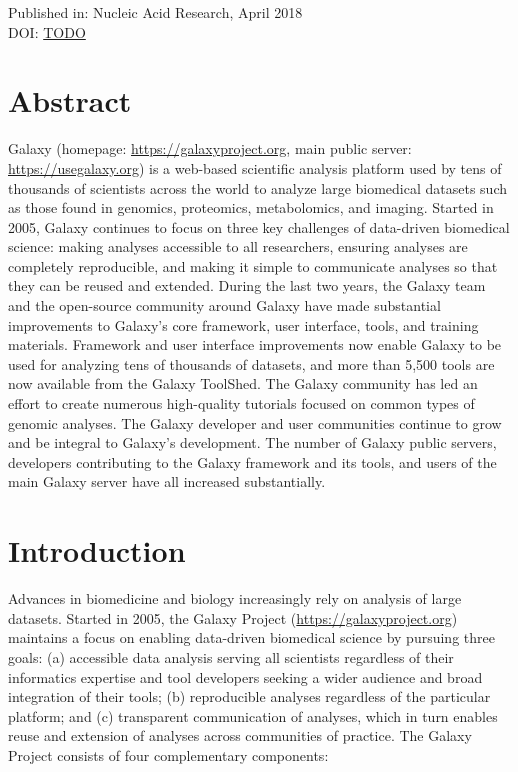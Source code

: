 Published in: Nucleic Acid Research, April 2018 \\
DOI: \url{TODO } \\

\section*{Abstract}
Galaxy (homepage: \url{https://galaxyproject.org}, main public server: \url{https://usegalaxy.org}) is a web-based scientific analysis platform used by tens of thousands of scientists across the world to analyze large biomedical datasets such as those found in genomics, proteomics, metabolomics, and imaging. Started in 2005, Galaxy continues to focus on three key challenges of data-driven biomedical science: making analyses accessible to all researchers, ensuring analyses are completely reproducible, and making it simple to communicate analyses so that they can be reused and extended. During the last two years, the Galaxy team and the open-source community around Galaxy have made substantial improvements to Galaxy’s core framework, user interface, tools, and training materials. Framework and user interface improvements now enable Galaxy to be used for analyzing tens of thousands of datasets, and more than 5,500 tools are now available from the Galaxy ToolShed. The Galaxy community has led an effort to create numerous high-quality tutorials focused on common types of genomic analyses. The Galaxy developer and user communities continue to grow and be integral to Galaxy’s development. The number of Galaxy public servers, developers contributing to the Galaxy framework and its tools, and users of the main Galaxy server have all increased substantially.


\section*{Introduction}
Advances in biomedicine and biology increasingly rely on analysis of large datasets. Started in 2005, the Galaxy Project (\url{https://galaxyproject.org}) \cite{giardine2005galaxy,blankenberg2007framework,afgan2016galaxy} maintains a focus on enabling data-driven biomedical science by pursuing three goals: (a) accessible data analysis serving all scientists regardless of their informatics expertise and tool developers seeking a wider audience and broad integration of their tools; (b) reproducible analyses regardless of the particular platform; and (c) transparent communication of analyses, which in turn enables reuse and extension of analyses across communities of practice. The Galaxy Project consists of four complementary components:

